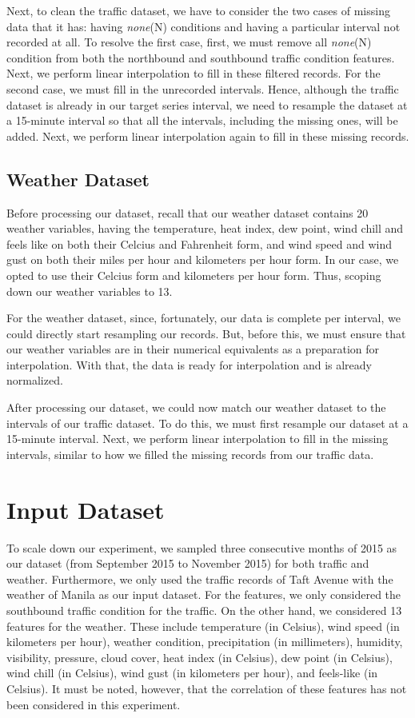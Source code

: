 Next, to clean the traffic dataset, we have to consider the two cases of missing data that it has: having \textit{none}(N) conditions and having a particular interval not recorded at all. To resolve the first case, first, we must remove all \textit{none}(N) condition from both the northbound and southbound traffic condition features. Next, we perform linear interpolation to fill in these filtered records. For the second case, we must fill in the unrecorded intervals. Hence, although the traffic dataset is already in our target series interval, we need to resample the dataset at a 15-minute interval so that all the intervals, including the missing ones, will be added. Next, we perform linear interpolation again to fill in these missing records.



\subsection{Weather Dataset}
Before processing our dataset, recall that our weather dataset contains 20 weather variables, having the temperature, heat index, dew point, wind chill and feels like on both their Celcius and Fahrenheit form, and wind speed and wind gust on both their miles per hour and kilometers per hour form. In our case, we opted to use their Celcius form and kilometers per hour form. Thus, scoping down our weather variables to 13.

For the weather dataset, since, fortunately, our data is complete per interval, we could directly start resampling our records. But, before this, we must ensure that our weather variables are in their numerical equivalents as a preparation for interpolation. With that, the data is ready for interpolation and is already normalized.

After processing our dataset, we could now match our weather dataset to the intervals of our traffic dataset. To do this, we must first resample our dataset at a 15-minute interval. Next, we perform linear interpolation to fill in the missing intervals, similar to how we filled the missing records from our traffic data.

\section{Input Dataset}
To scale down our experiment, we sampled three consecutive months of 2015 as our dataset (from September 2015 to November 2015) for both traffic and weather. Furthermore, we only used the traffic records of Taft Avenue with the weather of Manila as our input dataset. For the features, we only considered the southbound traffic condition for the traffic. On the other hand, we considered 13 features for the weather. These include temperature (in Celsius), wind speed (in kilometers per hour), weather condition, precipitation (in millimeters), humidity, visibility, pressure, cloud cover, heat index (in Celsius), dew point (in Celsius), wind chill (in Celsius), wind gust (in kilometers per hour), and feels-like (in Celsius). It must be noted, however, that the correlation of these features has not been considered in this experiment.



